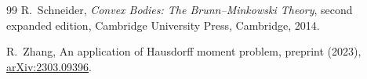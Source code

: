 \documentclass[11pt]{article}
\theoremstyle{remark}
\begin{document}
\begin{thebibliography}{99}
R.~Schneider,
\newblock \emph{Convex Bodies: The Brunn--Minkowski Theory}, second expanded edition,
\newblock Cambridge University Press, Cambridge, 2014.

R.~Zhang,
\newblock An application of Hausdorff moment problem,
\newblock preprint (2023),
\newblock \href{https://arxiv.org/abs/2303.09396}{arXiv:2303.09396}.

\end{thebibliography}
\end{document}
